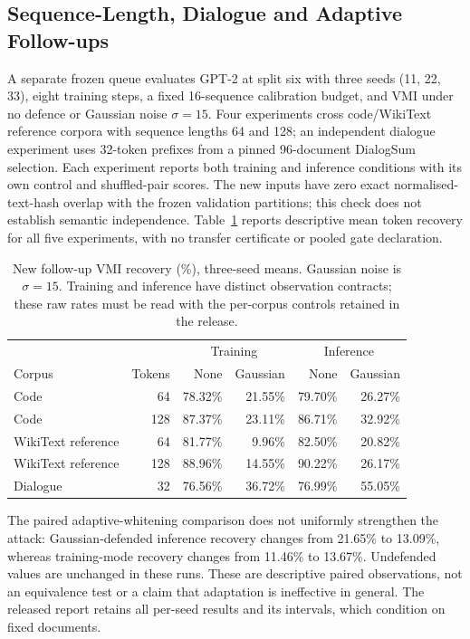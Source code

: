 \documentclass[11pt]{article}
\begin{document}
\subsection{Sequence-Length, Dialogue and Adaptive Follow-ups}
\label{sec:followups}
A separate frozen queue evaluates GPT-2 at split six with three seeds (11, 22, 33), eight training steps, a fixed 16-sequence calibration budget, and VMI under no defence or Gaussian noise $\sigma=15$. Four experiments cross code/WikiText reference corpora with sequence lengths 64 and 128; an independent dialogue experiment uses 32-token prefixes from a pinned 96-document DialogSum selection. Each experiment reports both training and inference conditions with its own control and shuffled-pair scores. The new inputs have zero exact normalised-text-hash overlap with the frozen validation partitions; this check does not establish semantic independence. Table~\ref{tab:followups} reports descriptive mean token recovery for all five experiments, with no transfer certificate or pooled gate declaration.

\begin{table}[ht]
\centering\small
\caption{New follow-up VMI recovery (\%), three-seed means. Gaussian noise is $\sigma=15$. Training and inference have distinct observation contracts; these raw rates must be read with the per-corpus controls retained in the release.}
\label{tab:followups}
\begin{tabular}{lr rrrr}
\toprule
 & & \multicolumn{2}{c}{Training} & \multicolumn{2}{c}{Inference} \\
Corpus & Tokens & None & Gaussian & None & Gaussian \\
\midrule
Code & 64 & 78.32\% & 21.55\% & 79.70\% & 26.27\% \\
Code & 128 & 87.37\% & 23.11\% & 86.71\% & 32.92\% \\
WikiText reference & 64 & 81.77\% & 9.96\% & 82.50\% & 20.82\% \\
WikiText reference & 128 & 88.96\% & 14.55\% & 90.22\% & 26.17\% \\
Dialogue & 32 & 76.56\% & 36.72\% & 76.99\% & 55.05\% \\
\bottomrule
\end{tabular}
\end{table}

The paired adaptive-whitening comparison does not uniformly strengthen the attack: Gaussian-defended inference recovery changes from 21.65\% to 13.09\%, whereas training-mode recovery changes from 11.46\% to 13.67\%. Undefended values are unchanged in these runs. These are descriptive paired observations, not an equivalence test or a claim that adaptation is ineffective in general. The released report retains all per-seed results and its intervals, which condition on fixed documents.
\end{document}
